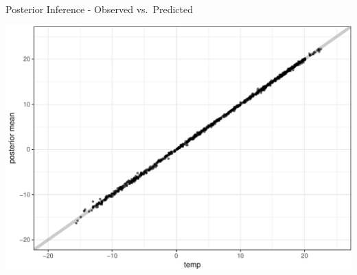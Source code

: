 \documentclass[11pt,ignorenonframetext,]{beamer}
\begin{document}
\begin{frame}{Posterior Inference - Observed vs.~Predicted}
\protect\hypertarget{posterior-inference---observed-vs.predicted}{}

\vspace{4mm}

\begin{center}\includegraphics[width=\textwidth]{Lec22_files/figure-beamer/unnamed-chunk-11-1} \end{center}

\end{frame}
\end{document}
